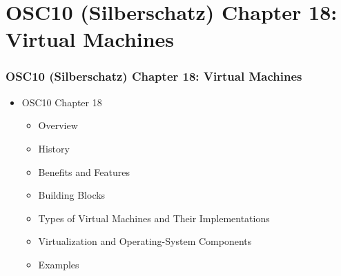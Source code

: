 \documentclass[aspectratio=169, xcolor=table, notheorems, hyperref={pdfpagelabels=false}]{beamer}
\begin{document}
\section{OSC10 (Silberschatz) Chapter 18: Virtual Machines}
\begin{frame}[fragile]
\frametitle{OSC10 (Silberschatz) Chapter 18: Virtual Machines}
\begin{itemize}
  \item OSC10 Chapter 18
  \begin{itemize}
    \item Overview
    \item History
    \item Benefits and Features
    \item Building Blocks
    \item Types of Virtual Machines and Their Implementations
    \item Virtualization and Operating-System Components
    \item Examples
  \end{itemize}
  \vfill \null
\end{itemize}
\vfill \null
\end{frame}

\end{document}
